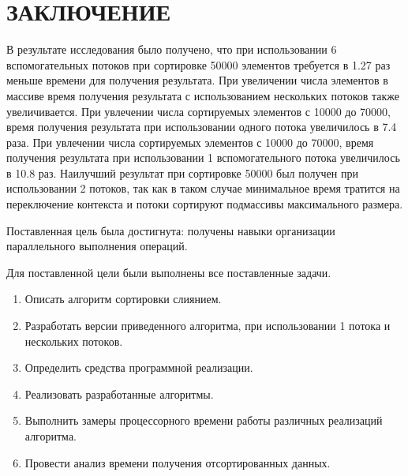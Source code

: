 \chapter*{\hfill{\centering  ЗАКЛЮЧЕНИЕ}\hfill}

В результате исследования было получено, что при использовании 6 вспомогательных потоков при сортировке 50000 элементов требуется в 1.27 раз меньше времени для получения результата. 
При увеличении числа элементов в массиве
время получения результата с использованием нескольких потоков также увеличивается. При увлечении числа сортируемых элементов с 10000 до 70000, время получения результата при использовании одного потока  увеличилось в 7.4 раза.
При увлечении числа сортируемых элементов с 10000 до 70000, время получения результата при использовании 1 вспомогательного потока увеличилось в 10.8 раз. Наилучший результат при сортировке 50000 был получен при использовании 2 потоков, так как в таком случае минимальное время тратится на переключение контекста и потоки сортируют подмассивы максимального размера.


Поставленная цель была достигнута: получены навыки организации параллельного выполнения операций.

Для поставленной цели были выполнены все поставленные задачи.
\label{sec:targets}
\begin{enumerate}
	\item Описать алгоритм сортировки слиянием.
	\item Разработать версии  приведенного алгоритма, при использовании 1 потока и нескольких потоков.
	\item Определить средства программной реализации.
	\item Реализовать разработанные алгоритмы.
	\item Выполнить замеры процессорного времени работы различных реализаций алгоритма.
	\item Провести анализ времени получения отсортированных данных.
\end{enumerate}

 

